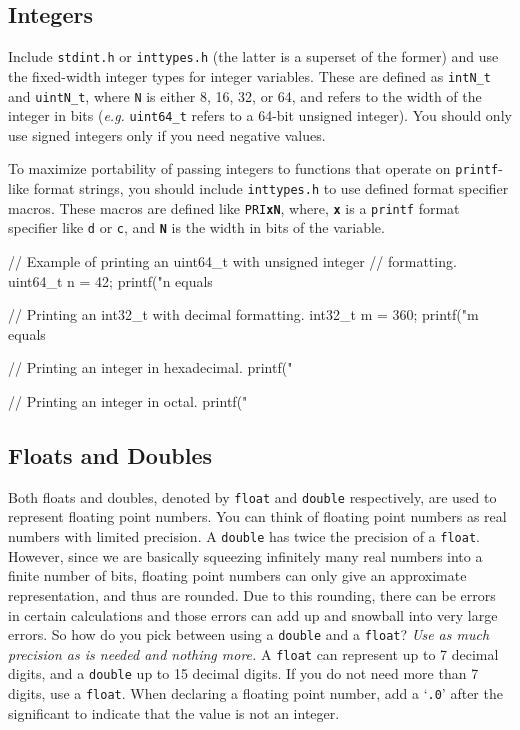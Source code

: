 \documentclass[11pt]{article}
\begin{document}
\subsection{Integers}

\noindent Include \texttt{stdint.h} or \texttt{inttypes.h} (the latter is a
superset of the former) and use the fixed-width integer types for integer
variables.  These are defined as \texttt{intN\_t} and \texttt{uintN\_t}, where
\texttt{N} is either 8, 16, 32, or 64, and refers to the width of the integer in
bits (\emph{e.g.} \texttt{uint64\_t} refers to a 64-bit unsigned integer). You
should only use signed integers only if you need negative values.

To maximize portability of passing integers to functions that operate on
\texttt{printf}-like format strings, you should include \texttt{inttypes.h} to
use defined format specifier macros. These macros are defined like
\texttt{PRI\textbf{xN}}, where, \texttt{\textbf{x}} is a \texttt{printf} format
specifier like \texttt{d} or \texttt{c}, and \texttt{\textbf{N}} is the width in
bits of the variable.

\begin{codelisting}{}
// Example of printing an uint64_t with unsigned integer 
// formatting.
uint64_t n = 42;
printf("n equals %

// Printing an int32_t with decimal formatting.
int32_t m = 360;
printf("m equals %

// Printing an integer in hexadecimal.
printf("%

// Printing an integer in octal.
printf("%
\end{codelisting}


\subsection{Floats and Doubles}

\noindent Both floats and doubles, denoted by \texttt{float} and \texttt{double}
respectively, are used to represent floating point numbers. You can think of
floating point numbers as real numbers with limited precision. A \texttt{double}
has twice the precision of a \texttt{float}. However, since we are basically
squeezing infinitely many real numbers into a finite number of bits, floating
point numbers can only give an approximate representation, and thus are rounded.
Due to this rounding, there can be errors in certain calculations and those errors 
can add up and snowball into very large errors. So how do you pick between using a \texttt{double} and a
\texttt{float}? \emph{Use as much precision as is needed and nothing more.} A
\texttt{float} can represent up to 7 decimal digits, and a \texttt{double} up to
15 decimal digits. If you do not need more than 7 digits, use a \texttt{float}.
When declaring a floating point number, add a `\texttt{.0}' after the significant to
indicate that the value is not an integer.
\end{document}
